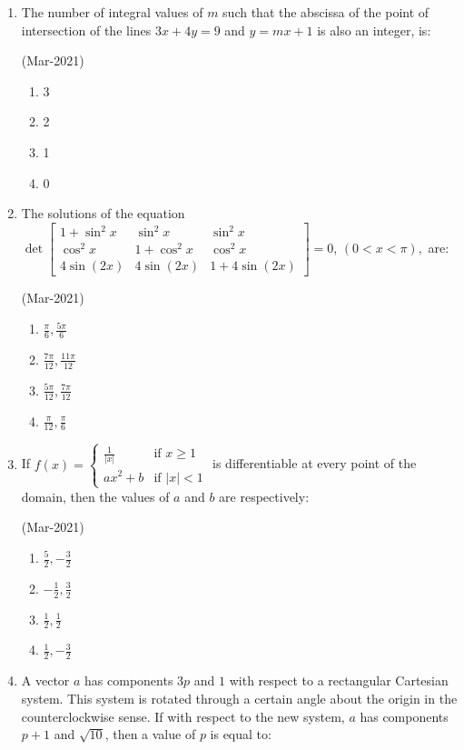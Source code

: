 \documentclass[journal,12pt,onecolumn]{IEEEtran}
\theoremstyle{remark}
\begin{document}
\begin{enumerate}
			\hfill{(Mar-2021)}
                \begin{enumerate}
    \item $\frac{101}{404}$
    \item $\frac{101}{408}$
    \item $\frac{99}{400}$
    \item $\frac{25}{101}$
                \end{enumerate}
	\item
		The number of integral values of $m$ such that the abscissa of the point of intersection of the lines $3x + 4y = 9$ and $y = mx + 1$ is also an integer, is:

			\hfill{(Mar-2021)}
                \begin{enumerate}
    \item 3
    \item 2
    \item 1
    \item 0
                \end{enumerate}
	\item
		The solutions of the equation $ \det\begin{bmatrix}
1 + \sin^2 x & \sin^2 x & \sin^2 x \\
\cos^2 x & 1 + \cos^2 x & \cos^2 x \\
4\sin(2x) & 4\sin(2x) & 1 + 4\sin(2x)
		\end{bmatrix} = 0 $, $(0 < x < \pi),$ are:

			\hfill{(Mar-2021)}
		\begin{enumerate}
    \item $ \frac{\pi}{6}, \frac{5\pi}{6} $
    \item $ \frac{7\pi}{12}, \frac{11\pi}{12} $
    \item $ \frac{5\pi}{12}, \frac{7\pi}{12} $
    \item $ \frac{\pi}{12}, \frac{\pi}{6} $
                \end{enumerate}
	\item
			If $f(x) = \begin{cases} \frac{1}{|x|} & \text{if } x \geq 1 \\ ax^2 + b & \text{if } |x| < 1 \end{cases}$ is differentiable at every point of the domain, then the values of $a$ and $b$ are respectively:

					\hfill{(Mar-2021)}
                \begin{enumerate}
    \item $ \frac{5}{2}, -\frac{3}{2} $
    \item $ -\frac{1}{2}, \frac{3}{2} $
    \item $ \frac{1}{2}, \frac{1}{2} $
    \item $ \frac{1}{2}, -\frac{3}{2} $
                \end{enumerate}
	\item
		A vector $a$ has components $3p$ and $1$ with respect to a rectangular Cartesian system. This system is rotated through a certain angle about the origin in the counterclockwise sense. If with respect to the new system, $a$ has components $p+1$ and $\sqrt{10}$, then a value of $p$ is equal to:


\end{enumerate}
\end{document}

